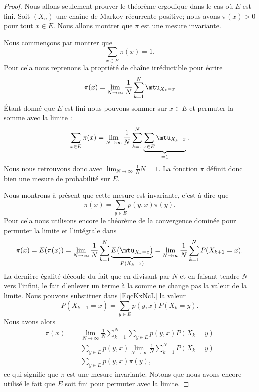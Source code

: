 \begin{proof}
    Nous allons seulement prouver le théorème ergodique dans le cas où \( E\) est fini. Soit \( (X_n)\) une chaîne de Markov récurrente positive; nous avons \( \pi(x)>0\) pour tout \( x\in E\). Nous allons montrer que \( \pi\) est une mesure invariante.

    Nous commençons par montrer que
    \begin{equation}
        \sum_{x\in E}\pi(x)=1.
    \end{equation}
    Pour cela nous reprenons la propriété de chaîne irréductible pour écrire
    \begin{equation}
        \pi(x)=\lim_{N\to \infty}\frac{1}{ N }\sum_{k=1}^N\mtu_{X_k=x}
    \end{equation}
    Étant donné que \( E\) est fini nous pouvons sommer sur \( x\in E\) et permuter la somme avec la limite :
    \begin{equation}
        \sum_{x\in E}\pi(x)=\lim_{N\to \infty} \frac{1}{ N }\sum_{k=1}^N\underbrace{\sum_{x\in E}\mtu_{X_k=x}}_{=1}.
    \end{equation}
    Nous nous retrouvons donc avec \( \lim_{N\to \infty} \frac{1}{ N }N=1\). La fonction \( \pi\) définit donc bien une mesure de probabilité sur \( E\).

    Nous montrons à présent que cette mesure est invariante, c'est à dire que
    \begin{equation}
        \pi(x)=\sum_{y\in E}p(y,x)\pi(y).
    \end{equation}
    Pour cela nous utilisons encore le théorème de la convergence dominée pour permuter la limite et l'intégrale dans
    \begin{equation}        \label{EqcKxNcL}
        \pi(x)=E(\pi(x))=\lim_{N\to \infty} \frac{1}{ N }\sum_{k=1}^N\underbrace{E\big( \mtu_{X_k=x} \big)}_{P(X_k=x)}=\lim_{N\to \infty} \frac{1}{ N }\sum_{k=1}^NP(X_{k+1}=x).
    \end{equation}
    La dernière égalité découle du fait que en divisant par \( N\) et en faisant tendre \( N\) vers l'infini, le fait d'enlever un terme à la somme ne change pas la valeur de la limite. Nous pouvons substituer dans \eqref{EqcKxNcL} la valeur
    \begin{equation}
        P(X_{k+1}=x)=\sum_{y\in E}p(y,x)P(X_k=y).
    \end{equation}
    Nous avons alors
    \begin{subequations}
        \begin{align}
            \pi(x)&=\lim_{N\to \infty} \frac{1}{ N }\sum_{k=1}^N\sum_{y\in E}p(y,x)P(X_k=y)\\
            &=\sum_{y\in E}p(y,x)\lim_{N\to \infty} \frac{1}{ N }\sum_{k=1}^NP(X_k=y)\\
            &=\sum_{y\in E}p(y,x)\pi(y),
        \end{align}
    \end{subequations}
    ce qui signifie que \( \pi\) est une mesure invariante. Notons que nous avons encore utilisé le fait que \( E\) soit fini pour permuter avec la limite.


\end{proof}
